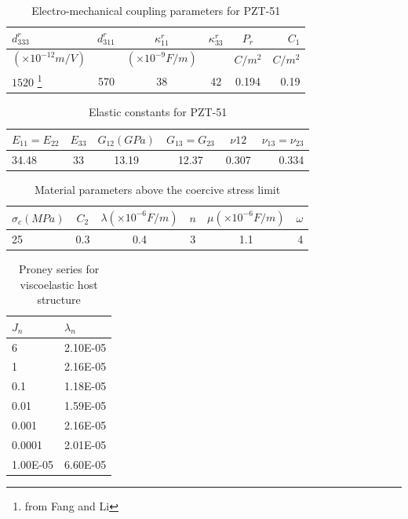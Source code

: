\begin{table}
\caption{Electro-mechanical coupling parameters for PZT-51}
\centering
\begin{tabular}{l c c c c r}
\hline 
$d^r_{333}$ & $d^r_{311}$& $\kappa^r_{11}$&$\kappa^r_{33}$ & $P_r$& $C_1$ \\  \hline
$(\times 10^{-12} m/V)$ & & $(\times 10^{-9} F/m)$ &  & $C/m^2$& $C/m^2$ \\ \hline
$1520$ \footnote{ from Fang and Li\cite{raey}} & 570 & 38 & 42 & 0.194 & 0.19 \\  \hline
\end{tabular}
\label{table:MatPZT-51_Electro_mechanical_coupling}
\end{table}

\begin{table}
\caption{Elastic constants for PZT-51 \cite{Muliana2011}}
\centering
\begin{tabular}{l c c c c r} 
\hline 
$E_{11}=E_{22}$ & $E_{33}$& $G_{12}(GPa)$&$G_{13}=G_{23}$ & $\nu{12}$& $\nu_{13}=\nu_{23} $ \\  \hline
34.48 & 33 & 13.19 &12.37 & 0.307 & 0.334 \\  \hline
\end{tabular}
\label{table:MatPZT-51_Elastic_constants} 
\end{table}

\begin{table}
\caption{Material parameters above the coercive stress limit}
\centering
\begin{tabular}{l c c c c r}
\hline 
$\sigma_c (MPa)$ & $C_2$& $\lambda (\times 10^{-6} F/m) $ & $ n $ & $ \mu (\times 10^{-6} F/m) $& $\omega $ \\  \hline
25 & 0.3 & 0.4 & 3 & 1.1 & 4 \\  \hline
\end{tabular}
\label{table:MatPZT-51_above_coercive} 
\end{table}

\begin{table}
\caption{Proney series for viscoelastic host structure}
\centering
\begin{tabular}{|l|l|}
\hline
$J_n$&$\lambda_n$\\ \hline
6&2.10E-05\\ \hline
1&2.16E-05\\ \hline
0.1&1.18E-05\\ \hline
0.01&1.59E-05\\ \hline
0.001&2.16E-05\\ \hline
0.0001&2.01E-05\\ \hline
1.00E-05&6.60E-05\\ \hline
\end{tabular}
\label{table:Proney_Host}
\end{table}


